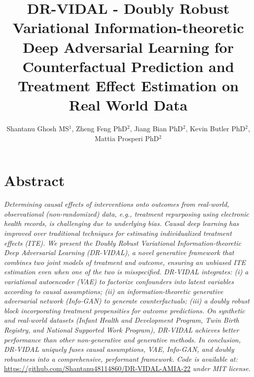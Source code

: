 \documentclass{amia}
\begin{document}
\title{DR-VIDAL - Doubly Robust Variational Information-theoretic Deep Adversarial Learning for Counterfactual Prediction and Treatment Effect Estimation on Real World Data}

\author{Shantanu Ghosh MS$^1$, Zheng Feng PhD$^2$, Jiang Bian PhD$^2$, Kevin Butler PhD$^2$, 
Mattia Prosperi PhD$^2$}


\maketitle

\section*{Abstract}

\textit{Determining causal effects of interventions onto outcomes from real-world, observational (non-randomized) data, e.g., treatment repurposing using electronic health records, is challenging due to underlying bias. Causal deep learning has improved over traditional techniques for estimating individualized treatment effects (ITE). We present the Doubly Robust Variational Information-theoretic Deep Adversarial Learning (DR-VIDAL), a novel generative framework that combines two joint models of treatment and outcome, ensuring an unbiased ITE estimation even when one of the two is misspecified. DR-VIDAL integrates: (i) a variational autoencoder (VAE) to factorize confounders into latent variables according to causal assumptions; (ii) an information-theoretic generative adversarial network (Info-GAN) to generate counterfactuals; (iii) a doubly robust block incorporating treatment propensities for outcome predictions. On synthetic and real-world datasets (Infant Health and Development Program, Twin Birth Registry, and National Supported Work Program), DR-VIDAL achieves better performance than other non-generative and generative methods. In conclusion, DR-VIDAL uniquely fuses causal assumptions, VAE, Info-GAN, and doubly robustness into a comprehensive, performant framework. Code is available at:} \url{https://github.com/Shantanu48114860/DR-VIDAL-AMIA-22} \textit{under MIT license.} 

\end{document}
